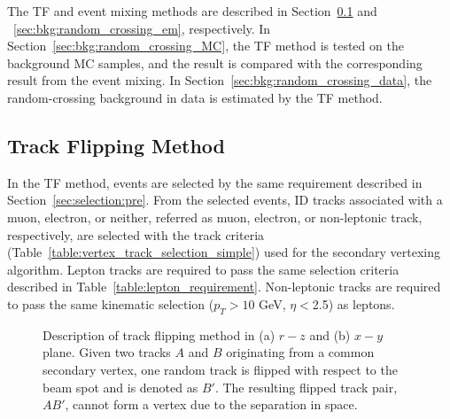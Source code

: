 The TF and event mixing methods are described in Section~\ref{sec:bkg:random_crossing_tf} and ~\ref{sec:bkg:random_crossing_em}, respectively. In Section~\ref{sec:bkg:random_crossing_MC}, the TF method is tested on the background MC samples, and the result is compared with the corresponding result from the event mixing. In Section~\ref{sec:bkg:random_crossing_data}, the random-crossing background in data is estimated by the TF method.%

\subsection{Track Flipping Method}
\label{sec:bkg:random_crossing_tf}

In the TF method, events are selected by the same requirement described in Section~\ref{sec:selection:pre}. From the selected events, ID tracks associated with a muon, electron, or neither, referred as muon, electron, or non-leptonic track, respectively, are selected with the track criteria (Table~\ref{table:vertex_track_selection_simple}) used for the secondary vertexing algorithm. Lepton tracks are required to pass the same selection criteria described in Table~\ref{table:lepton_requirement}. Non-leptonic tracks are required to pass the same kinematic selection ($p_{T} > 10$ GeV, $\eta < $2.5) as leptons.

\begin{figure}[!htb]
	\centering
	\caption{Description of track flipping method in (a) $r-z$ and (b) $x-y$ plane. Given two tracks $A$ and $B$ originating from a common secondary vertex, one random track is flipped with respect to the beam spot and is denoted as $B'$. The resulting flipped track pair, $AB'$, cannot form a vertex due to the separation in space.}
	\label{fig:TF_diagram}
\end{figure}

